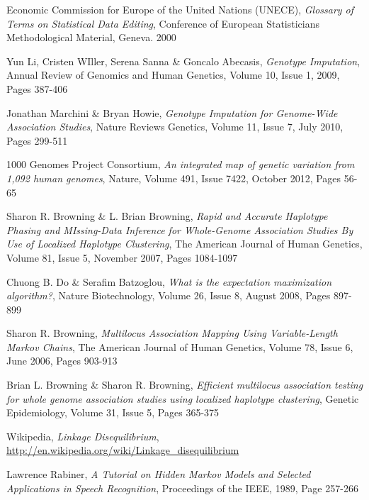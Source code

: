 \documentclass[a4paper,11pt,twoside,abstraction,titlepage]{article}
\begin{document}
\newpage


\begin{thebibliography}{99}

 Economic Commission for Europe of the United Nations (UNECE), \emph{Glossary of Terms on Statistical Data Editing}, Conference of European Statisticians Methodological Material, Geneva. 2000

 Yun Li, Cristen WIller, Serena Sanna \& Goncalo Abecasis, \emph{Genotype Imputation}, Annual Review of Genomics and Human Genetics, Volume 10, Issue 1,  2009, Pages 387-406

 Jonathan Marchini \& Bryan Howie, \emph{Genotype Imputation for Genome-Wide Association Studies}, Nature Reviews Genetics, Volume 11, Issue 7, July 2010, Pages 299-511

 1000 Genomes Project Consortium, \emph{An integrated map of genetic variation from 1,092 human genomes}, Nature, Volume 491, Issue 7422, October 2012, Pages 56-65

 Sharon R. Browning \& L. Brian Browning, \emph{Rapid and Accurate Haplotype Phasing and MIssing-Data Inference for Whole-Genome Association Studies By Use of Localized Haplotype Clustering}, The American Journal of Human Genetics, Volume 81, Issue 5, November 2007, Pages 1084-1097

 Chuong B. Do \& Serafim Batzoglou, \emph{What is the expectation maximization algorithm?}, Nature Biotechnology, Volume 26, Issue 8, August 2008, Pages 897-899

 Sharon R. Browning, \emph{Multilocus Association Mapping Using Variable-Length Markov Chains}, The American Journal of Human Genetics, Volume 78, Issue 6, June 2006, Pages 903-913

 Brian L. Browning \& Sharon R. Browning, \emph{Efficient multilocus association testing for whole genome association studies using localized haplotype clustering},  Genetic Epidemiology, Volume 31, Issue 5, Pages 365-375

 Wikipedia, \emph{Linkage Disequilibrium}, \url{http://en.wikipedia.org/wiki/Linkage_disequilibrium}

 Lawrence Rabiner, \emph{A Tutorial on Hidden Markov Models and Selected Applications in Speech Recognition}, Proceedings of the IEEE, 1989, Page 257-266




\end{thebibliography}
\end{document}
